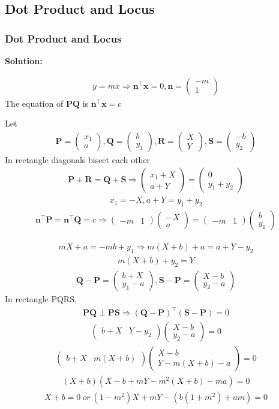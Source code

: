 \documentclass{beamer}
\theoremstyle{remark}
\newcommand{\myvec}[1]{\ensuremath{\begin{pmatrix}#1\end{pmatrix}}}
\let\vec\mathbf
\numberwithin{equation}{section}
\begin{document}
\subsection{ Dot Product  and Locus}
\begin{frame}
\frametitle{Dot Product and Locus}
\textbf{Solution:}

\begin{align}
y=mx \Longrightarrow \vec{n}^\top\vec{x}=0,\vec{n}=\myvec{-m\\1}
\end{align}
The equation of $\vec{P}\vec{Q}$ is $\vec{n}^\top\vec{x}=c$

Let 
\begin{align}
\vec{P}=\myvec{x_1\\a},\vec{Q}=\myvec{b\\y_1},\vec{R}=\myvec{X\\Y},\vec{S}=\myvec{-b\\y_2}
\end{align}
In rectangle diagonals bisect each other
\begin{align}
\vec{P}+\vec{R}=\vec{Q}+\vec{S} \Longrightarrow \myvec{x_1+X\\a+Y}=\myvec{0\\y_1+y_2} 
\end{align}
\begin{align}
x_1=-X, a+Y=y_1+y_2
\end{align}
\begin{align}
\vec{n}^\top\vec{P}=\vec{n}^\top\vec{Q}=c \Longrightarrow \myvec{-m & 1}\myvec{-X\\a}=\myvec{-m & 1}\myvec{b\\y_1}
\end{align}
\end{frame}
\begin{frame}
\begin{align}
mX+a = -mb+y_1 \Longrightarrow m(X+b)+a=a+Y-y_2
\end{align}
\begin{align}
m(X+b)+y_2 = Y
\end{align}
\begin{align}
\vec{Q}-\vec{P}=\myvec{b+X\\y_1-a},\vec{S}-\vec{P}=\myvec{X-b\\y_2-a}
\end{align}
In  rectangle  PQRS,
\begin{align}
 \vec{P}\vec{Q} \perp \vec{P}\vec{S} \Longrightarrow (\vec{Q}-\vec{P})^\top(\vec{S}-\vec{P})=0 
\end{align}
\begin{align}
\myvec{b+X & Y-y_2}\myvec{X-b\\y_2-a} = 0 
\end{align}
\begin{align}
\myvec{b+X & m(X+b)}\myvec{X-b\\Y-m(X+b)-a} = 0
\end{align}
\begin{align}
(X+b)(X-b+mY-m^2(X+b)-ma) = 0
\end{align}
\begin{align}
X+b = 0 \ or \ (1-m^2)X+mY-(b(1+m^2)+am) = 0
\end{align}
\end{frame}
\end{document}
